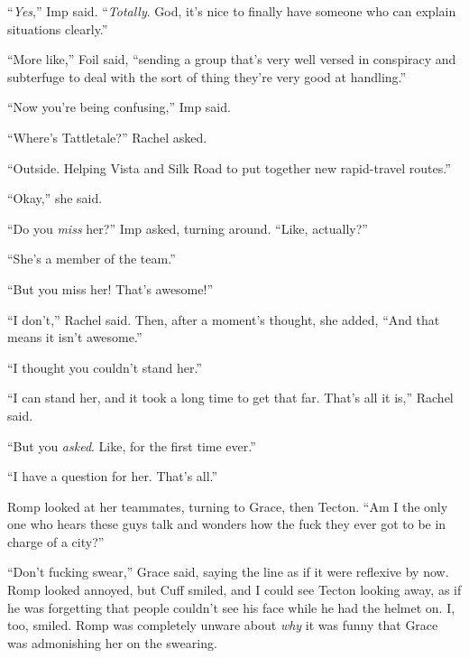 ``\emph{Yes},'' Imp said.  ``\emph{Totally}.  God, it's nice to finally have someone who can explain situations clearly.''



``More like,'' Foil said, ``sending a group that's very well versed in conspiracy and subterfuge to deal with the sort of thing they're very good at handling.''



``Now you're being confusing,'' Imp said.



``Where's Tattletale?'' Rachel asked.



``Outside.  Helping Vista and Silk Road to put together new rapid-travel routes.''



``Okay,'' she said.



``Do you \emph{miss} her?'' Imp asked, turning around.  ``Like, actually?''



``She's a member of the team.''



``But you miss her!  That's awesome!''



``I don't,'' Rachel said.  Then, after a moment's thought, she added, ``And that means it isn't awesome.''



``I thought you couldn't stand her.''



``I can stand her, and it took a long time to get that far.  That's all it is,'' Rachel said.



``But you \emph{asked}.  Like, for the first time ever.''



``I have a question for her.  That's all.''



Romp looked at her teammates, turning to Grace, then Tecton.  ``Am I the only one who hears these guys talk and wonders how the fuck they ever got to be in charge of a city?''



``Don't fucking swear,'' Grace said, saying the line as if it were reflexive by now.  Romp looked annoyed, but Cuff smiled, and I could see Tecton looking away, as if he was forgetting that people couldn't see his face while he had the helmet on.  I, too, smiled.  Romp was completely unware about \emph{why} it was funny that Grace was admonishing her on the swearing.



